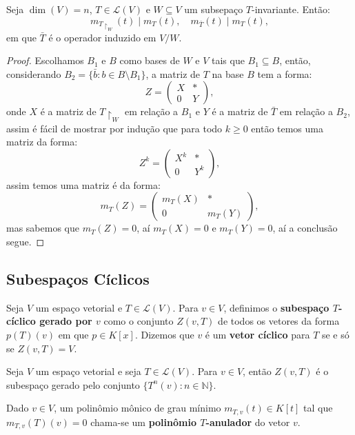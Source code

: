 \documentclass[11pt,twoside,a4paper]{book}
\begin{document}
\begin{lema}
Seja $\dim(V)=n$, $T\in\mathcal{L}(V)$ e $W\subseteq V$ um subsepaço $T$-invariante. Então:
\[
m_{T\upharpoonright_W}(t)\mid m_T(t),\quad m_{\bar{T}}(t)\mid m_T(t),
\]
em que $\bar{T}$ é o operador induzido em $V/W$.
\end{lema}
\begin{proof}
Escolhamos $B_1$ e $B$ como bases de $W$ e $V$ tais que $B_1\subseteq B$, então, considerando $B_2=\{\bar{b}:b\in B\setminus B_1\}$, a matriz de \(T\) na base \(B\) tem a forma:
\[Z=\begin{pmatrix}
X & * \\ 0 & Y\end{pmatrix},\]
onde $X$ é a matriz de $T\upharpoonright_W$ em relação a $B_1$ e $Y$ é a matriz de $\bar{T}$ em relação a $B_2$, assim é fácil de mostrar por indução que para todo $k\geq 0$ então temos uma matriz da forma:
\[
Z^k=
\begin{pmatrix}
X^k & * \\ 0 & Y^k
\end{pmatrix},
\]
assim temos uma matriz é da forma:
\[
m_T(Z)=
\begin{pmatrix}
m_T(X) & * \\ 0 & m_T(Y)
\end{pmatrix},
\]
mas sabemos que $m_T(Z)=0$, aí $m_T(X)=0$ e $m_T(Y)=0$, aí a conclusão segue.
\end{proof}

\subsection{Subespaços Cíclicos}

\begin{definicao}
Seja $V$ um espaço vetorial e $T\in\mathcal{L}(V)$. Para $v\in V$, definimos o \textbf{subespaço $T$-cíclico gerado por $v$} como o conjunto $Z(v,T)$ de todos os vetores da forma $p(T)(v)$ em que $p\in K[x]$. Dizemos que $v$ é um \textbf{vetor cíclico} para $T$ se e só se $Z(v,T)=V$.
\end{definicao}

\begin{proposicao}
Seja $V$ um espaço vetorial e seja $T\in\mathcal{L}(V)$. Para $v\in V$, então $Z(v,T)$ é o subespaço gerado pelo conjunto $\{T^n(v):n\in\mathbb{N}\}$.
\end{proposicao}

\begin{definicao}
Dado $v\in V$, um polinômio mônico de grau mínimo $m_{T,v}(t)\in K[t]$ tal que $m_{T,v}(T)(v)=0$ chama-se um \textbf{polinômio $T$-anulador} do vetor $v$.
\end{definicao}
\end{document}
